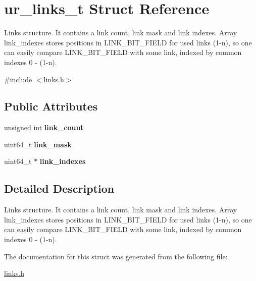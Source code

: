 \hypertarget{structur__links__t}{}\section{ur\+\_\+links\+\_\+t Struct Reference}
\label{structur__links__t}


Links structure. It contains a link count, link mask and link indexes. Array link\+\_\+indexes stores positions in L\+I\+N\+K\+\_\+\+B\+I\+T\+\_\+\+F\+I\+E\+LD for used links (1-\/n), so one can easily compare L\+I\+N\+K\+\_\+\+B\+I\+T\+\_\+\+F\+I\+E\+LD with some link, indexed by common indexes 0 -\/ (1-\/n).  




{\ttfamily \#include $<$links.\+h$>$}

\subsection*{Public Attributes}
\begin{DoxyCompactItemize}
\item 
unsigned int {\bfseries link\+\_\+count}\hypertarget{structur__links__t_a4c9bf894635e57dbd1101cdd4210b4d1}{}\label{structur__links__t_a4c9bf894635e57dbd1101cdd4210b4d1}

\item 
uint64\+\_\+t {\bfseries link\+\_\+mask}\hypertarget{structur__links__t_abf9e1b6345f9757c679df5633313ee75}{}\label{structur__links__t_abf9e1b6345f9757c679df5633313ee75}

\item 
uint64\+\_\+t $\ast$ {\bfseries link\+\_\+indexes}\hypertarget{structur__links__t_a6d882bfc96e7c43de4e9dcc0f6e9f628}{}\label{structur__links__t_a6d882bfc96e7c43de4e9dcc0f6e9f628}

\end{DoxyCompactItemize}


\subsection{Detailed Description}
Links structure. It contains a link count, link mask and link indexes. Array link\+\_\+indexes stores positions in L\+I\+N\+K\+\_\+\+B\+I\+T\+\_\+\+F\+I\+E\+LD for used links (1-\/n), so one can easily compare L\+I\+N\+K\+\_\+\+B\+I\+T\+\_\+\+F\+I\+E\+LD with some link, indexed by common indexes 0 -\/ (1-\/n). 

The documentation for this struct was generated from the following file\+:\begin{DoxyCompactItemize}
\item 
\hyperlink{links_8h}{links.\+h}\end{DoxyCompactItemize}
